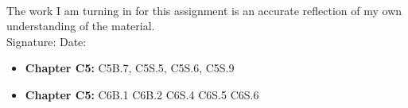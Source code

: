 \documentclass[12pt]{article}
\begin{document}
\\

\bigskip
\bigskip

\noindent The work I am turning in for this assignment is an accurate
reflection of my own understanding of the material.\\[14pt]

\noindent Signature: \underline{\hspace{7cm}} \hspace{1cm} Date:
\underline{\hspace{5cm}}\\



\hline 

\medskip
\begin{itemize}
\item {\bf Chapter C5:}  C5B.7, C5S.5, C5S.6, C5S.9

\item {\bf Chapter C5:} C6B.1 C6B.2 C6S.4 C6S.5 C6S.6 
\end{itemize}
\end{document}
